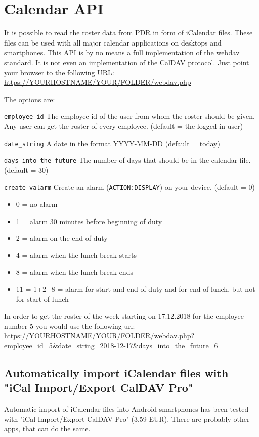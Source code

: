 \section{Calendar API}\label{section-calendar-api}
It is possible to read the roster data from PDR in form of iCalendar files.
These files can be used with all major calendar applications on desktops and smartphones.
This API is by no means a full implementation of the webdav standard. It is not even an implementation of the CalDAV protocol.
Just point your browser to the following URL:
\url{https://YOURHOSTNAME/YOUR/FOLDER/webdav.php}


The options are:
\begin{description}
	\item \lstinline|employee_id|
	The employee id of the user from whom the roster should be given.
	Any user can get the roster of every employee.
	(default = the logged in user)
	\item \lstinline|date_string|
	A date in the format YYYY-MM-DD
	(default = today)
	\item \lstinline|days_into_the_future|
	The number of days that should be in the calendar file.
	(default = 30)
	\item \lstinline|create_valarm|
	Create an alarm (\lstinline|ACTION:DISPLAY|) on your device.
	(default = 0)
	\begin{itemize}
        \item 0 = no alarm
        \item 1 = alarm 30 minutes before beginning of duty
        \item 2 = alarm on the end of duty
        \item 4 = alarm when the lunch break starts
        \item 8 = alarm when the lunch break ends
        \item 11 = 1+2+8 = alarm for start and end of duty and for end of lunch, but not for start of lunch
    \end{itemize}
\end{description}

In order to get the roster of the week starting on 17.12.2018 for the employee number 5 you would use the following url:
\url{https://YOURHOSTNAME/YOUR/FOLDER/webdav.php?employee_id=5&date_string=2018-12-17&days_into_the_future=6}

\subsection{Automatically import iCalendar files with "iCal Import/Export CalDAV Pro"}
Automatic import of iCalendar files into Android smartphones has been tested with
"iCal Import/Export CalDAV Pro" (3,59 EUR). There are probably other apps, that can do the same.

